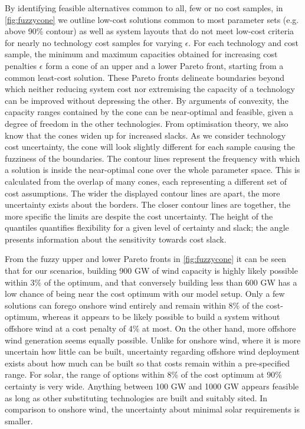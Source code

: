 By identifying feasible alternatives common to all, few or no cost samples, in
\cref{fig:fuzzycone} we outline low-cost solutions common to most parameter sets
(e.g. above 90\% contour) as well as system layouts that do not meet low-cost
criteria for nearly no technology cost samples for varying $\epsilon$. For each
technology and cost sample, the minimum and maximum capacities obtained for
increasing cost penalties $\epsilon$ form a cone of an upper and a lower Pareto
front, starting from a common least-cost solution. These Pareto fronts delineate
boundaries beyond which neither reducing system cost nor extremising the
capacity of a technology can be improved without depressing the other. By
arguments of convexity, the capacity ranges contained by the cone can be
near-optimal and feasible, given a degree of freedom in the other technologies.
From optimisation theory, we also know that the cones widen up for increased
slacks. As we consider technology cost uncertainty, the cone will look slightly
different for each sample causing the fuzziness of the boundaries. The contour
lines represent the frequency with which a solution is inside the near-optimal
cone over the whole parameter space. This is calculated from the overlap of many
cones, each representing a different set of cost assumptions. The wider the
displayed contour lines are apart, the more uncertainty exists about the
borders. The closer contour lines are together, the more specific the limits are
despite the cost uncertainty. The height of the quantiles quantifies flexibility
for a given level of certainty and slack; the angle presents information about
the sensitivity towards cost slack.


From the fuzzy upper and lower Pareto fronts in \cref{fig:fuzzycone} it can be
seen that for our scenarios, building 900 GW of wind capacity is highly likely
possible within 3\% of the optimum, and that conversely building less than 600
GW has a low chance of being near the cost optimum with our model setup. Only a
few solutions can forego onshore wind entirely and remain within 8\% of the
cost-optimum, whereas it appears to be likely possible to build a system without
offshore wind at a cost penalty of 4\% at most. On the other hand, more offshore
wind generation seems equally possible. Unlike for onshore wind, where it is
more uncertain how little can be built, uncertainty regarding offshore wind
deployment exists about how much can be built so that costs remain within a
pre-specified range. For solar, the range of options within 8\% of the cost
optimum at 90\% certainty is very wide. Anything between 100 GW and 1000 GW
appears feasible as long as other substituting technologies are built and
suitably sited. In comparison to onshore wind, the uncertainty about minimal
solar requirements is smaller.

